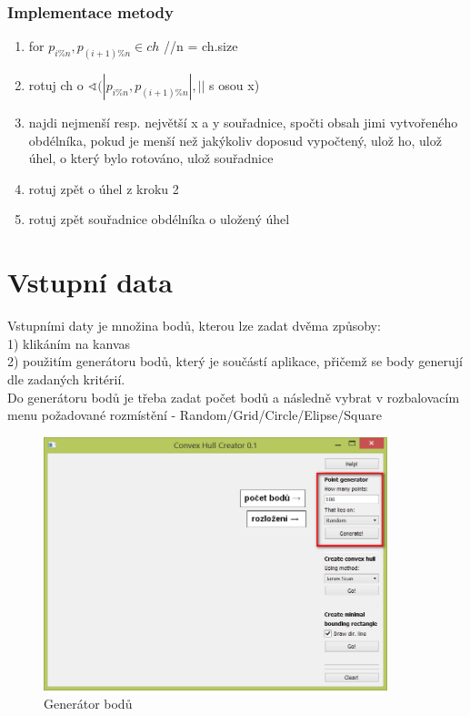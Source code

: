 \documentclass[a4paper, 12pt]{article}
\begin{document}
\subsubsection{Implementace metody}
\begin{enumerate}

	\item for $p_{i\%n}, p_{(i+1)\%n} \in ch$ //n = ch.size
	\item \hspace{1cm} rotuj ch o $\sphericalangle (|p_{i\%n}, p_{(i+1)\%n}| , ||$ s osou x)
	\item \hspace{1cm} najdi nejmenší resp. největší x a y souřadnice, spočti obsah jimi vytvořeného obdélníka, pokud je menší než jakýkoliv doposud vypočtený, ulož ho, ulož úhel, o který bylo rotováno, ulož souřadnice 
	\item \hspace{1cm} rotuj zpět o úhel z kroku 2
	\item rotuj zpět souřadnice obdélníka o uložený úhel	
	
\end{enumerate}



\section{Vstupní data}

Vstupními daty je množina bodů, kterou lze zadat dvěma způsoby:\\
1) klikáním na kanvas\\
2) použitím generátoru bodů, který je součástí aplikace, přičemž se body generují dle zadaných kritérií.\\


 Do generátoru bodů je třeba zadat počet bodů a následně vybrat v rozbalovacím menu 
 požadované rozmístění - Random/Grid/Circle/Elipse/Square 

\begin{figure}[h]
	\centering
	\includegraphics[width=10cm]{vstup_nastaveni.jpg}
	\caption{Generátor bodů}
\end{figure}
 
\end{document}
